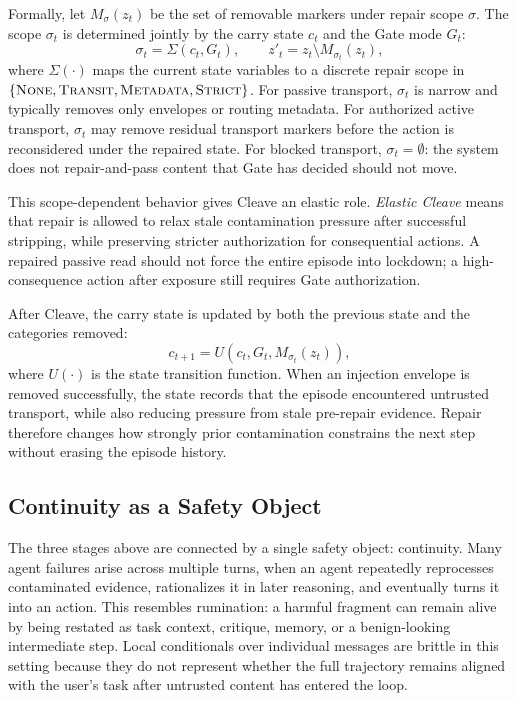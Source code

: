 Formally, let $M_\sigma(z_t)$ be the set of removable markers under repair scope $\sigma$. The scope $\sigma_t$ is determined jointly by the carry state $c_t$ and the Gate mode $G_t$:
\begin{equation}
    \sigma_t = \Sigma(c_t,G_t), \qquad
    z'_t = z_t \setminus M_{\sigma_t}(z_t),
\end{equation}
where $\Sigma(\cdot)$ maps the current state variables to a discrete repair scope in $\{\textsc{None}, \textsc{Transit}, \textsc{Metadata}, \textsc{Strict}\}$. For passive transport, $\sigma_t$ is narrow and typically removes only envelopes or routing metadata. For authorized active transport, $\sigma_t$ may remove residual transport markers before the action is reconsidered under the repaired state. For blocked transport, $\sigma_t=\emptyset$: the system does not repair-and-pass content that Gate has decided should not move.

This scope-dependent behavior gives Cleave an elastic role. \emph{Elastic Cleave} means that repair is allowed to relax stale contamination pressure after successful stripping, while preserving stricter authorization for consequential actions. A repaired passive read should not force the entire episode into lockdown; a high-consequence action after exposure still requires Gate authorization.

After Cleave, the carry state is updated by both the previous state and the categories removed:
\begin{equation}
    c_{t+1} = U(c_t, G_t, M_{\sigma_t}(z_t)),
\end{equation}
where $U(\cdot)$ is the state transition function. When an injection envelope is removed successfully, the state records that the episode encountered untrusted transport, while also reducing pressure from stale pre-repair evidence. Repair therefore changes how strongly prior contamination constrains the next step without erasing the episode history.

\subsection{Continuity as a Safety Object}
\label{sec:continuity}

The three stages above are connected by a single safety object: continuity. Many agent failures arise across multiple turns, when an agent repeatedly reprocesses contaminated evidence, rationalizes it in later reasoning, and eventually turns it into an action. This resembles rumination: a harmful fragment can remain alive by being restated as task context, critique, memory, or a benign-looking intermediate step. Local conditionals over individual messages are brittle in this setting because they do not represent whether the full trajectory remains aligned with the user's task after untrusted content has entered the loop.

